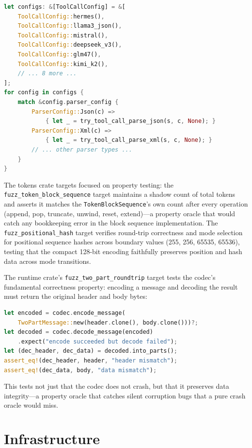 \begin{lstlisting}[language=Rust,caption={Crash oracle across all 14 named parser configurations.}]
let configs: &[ToolCallConfig] = &[
    ToolCallConfig::hermes(),
    ToolCallConfig::llama3_json(),
    ToolCallConfig::mistral(),
    ToolCallConfig::deepseek_v3(),
    ToolCallConfig::glm47(),
    ToolCallConfig::kimi_k2(),
    // ... 8 more ...
];
for config in configs {
    match &config.parser_config {
        ParserConfig::Json(c) =>
            { let _ = try_tool_call_parse_json(s, c, None); }
        ParserConfig::Xml(c) =>
            { let _ = try_tool_call_parse_xml(s, c, None); }
        // ... other parser types ...
    }
}
\end{lstlisting}

The tokens crate targets focused on property testing: the \texttt{fuzz\_token\_block\_sequence} target maintains a shadow count of total tokens and asserts it matches the \texttt{TokenBlockSequence}'s own count after every operation (append, pop, truncate, unwind, reset, extend)---a property oracle that would catch any bookkeeping error in the block sequence implementation. The \texttt{fuzz\_positional\_hash} target verifies round-trip correctness and mode selection for positional sequence hashes across boundary values (255, 256, 65535, 65536), testing that the compact 128-bit encoding faithfully preserves position and hash data across mode transitions.

The runtime crate's \texttt{fuzz\_two\_part\_roundtrip} target tests the codec's fundamental correctness property: encoding a message and decoding the result must return the original header and body bytes:

\begin{lstlisting}[language=Rust,caption={Round-trip property oracle for the TwoPartCodec.}]
let encoded = codec.encode_message(
    TwoPartMessage::new(header.clone(), body.clone()))?;
let decoded = codec.decode_message(encoded)
    .expect("encode succeeded but decode failed");
let (dec_header, dec_data) = decoded.into_parts();
assert_eq!(dec_header, header, "header mismatch");
assert_eq!(dec_data, body, "data mismatch");
\end{lstlisting}

This tests not just that the codec does not crash, but that it preserves data integrity---a property oracle that catches silent corruption bugs that a pure crash oracle would miss.

\section{Infrastructure}
\label{sec:fuzzing:infra}

